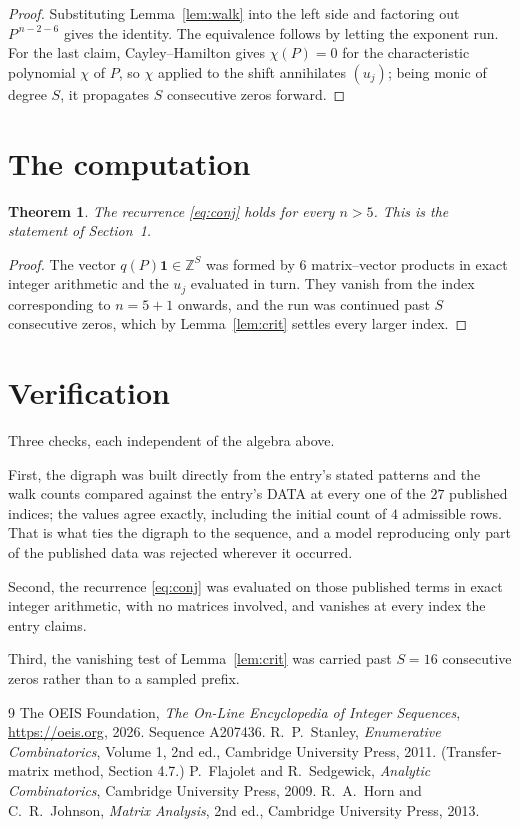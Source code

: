 \documentclass[11pt,a4paper]{article}
\theoremstyle{plain}
\newtheorem{theorem}{Theorem}
\theoremstyle{definition}
\begin{document}
\begin{proof}
Substituting Lemma~\ref{lem:walk} into the left side and factoring out
$P^{\,n-2-6}$ gives the identity. The equivalence follows by letting the exponent
run. For the last claim, Cayley--Hamilton gives $\chi(P)=0$ for the characteristic
polynomial $\chi$ of $P$, so $\chi$ applied to the shift annihilates $(u_j)$; being monic of
degree $S$, it propagates $S$ consecutive zeros forward.
\end{proof}

\section{The computation}

\begin{theorem}
The recurrence \eqref{eq:conj} holds for every $n>5$. This is the statement of
Section~1.
\end{theorem}

\begin{proof}
The vector $q(P)\mathbf{1}\in\mathbb{Z}^{S}$ was formed by $6$ matrix--vector
products in exact integer arithmetic and the $u_j$ evaluated in turn. They vanish from the
index corresponding to $n=5+1$ onwards, and the run was continued past $S$ consecutive
zeros, which by Lemma~\ref{lem:crit} settles every larger index.
\end{proof}

\section{Verification}

Three checks, each independent of the algebra above.

First, the digraph was built directly from the entry's stated patterns and the walk counts
compared against the entry's DATA at every one of the $27$ published indices; the
values agree exactly, including the initial count of $4$ admissible rows. That is
what ties the digraph to the sequence, and a model reproducing only part of the published
data was rejected wherever it occurred.

Second, the recurrence \eqref{eq:conj} was evaluated on those published terms in exact
integer arithmetic, with no matrices involved, and vanishes at every index the entry claims.

Third, the vanishing test of Lemma~\ref{lem:crit} was carried past $S=16$ consecutive
zeros rather than to a sampled prefix.

\begin{thebibliography}{9}
 The OEIS Foundation, \emph{The On-Line Encyclopedia of Integer
Sequences}, \url{https://oeis.org}, 2026. Sequence A207436.
 R.~P.~Stanley, \emph{Enumerative Combinatorics}, Volume 1, 2nd ed.,
Cambridge University Press, 2011. (Transfer-matrix method, Section 4.7.)
 P.~Flajolet and R.~Sedgewick, \emph{Analytic Combinatorics}, Cambridge
University Press, 2009.
 R.~A.~Horn and C.~R.~Johnson, \emph{Matrix Analysis}, 2nd ed., Cambridge
University Press, 2013.
\end{thebibliography}
\end{document}
